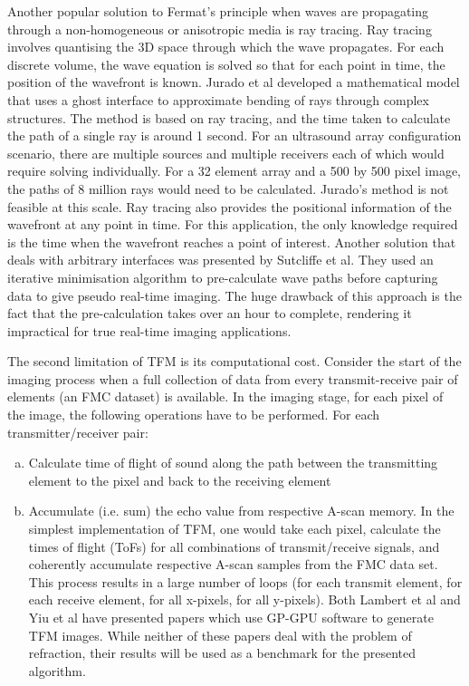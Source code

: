 Another popular solution to Fermat's principle when waves are propagating through a non-homogeneous or anisotropic media is ray tracing. Ray tracing involves quantising the 3D space through which the wave propagates. For each discrete volume, the wave equation is solved so that for each point in time, the position of the wavefront is known\cite{zhang_ray-based_2006}. Jurado et al developed a mathematical model that uses a ghost interface to approximate bending of rays through complex structures\cite{jurado_fast_1998}. The method is based on ray tracing, and the time taken to calculate the path of a single ray is around 1 second. For an ultrasound array configuration scenario, there are multiple sources and multiple receivers each of which would require solving individually. For a 32 element array and a 500 by 500 pixel image, the paths of 8 million rays would need to be calculated. Jurado's method is not feasible at this scale. Ray tracing also provides the positional information of the wavefront at any point in time. For this application, the only knowledge required is the time when the wavefront reaches a point of interest. Another solution that deals with arbitrary interfaces was presented by Sutcliffe et al\cite{sutcliffe_real-time_2012}. They used an iterative minimisation algorithm to pre-calculate wave paths before capturing data to give pseudo real-time imaging. The huge drawback of this approach is the fact that the pre-calculation takes over an hour to complete, rendering it impractical for true real-time imaging applications.

The second limitation of TFM is its computational cost. Consider the start of the imaging process when a full collection of data from every transmit-receive pair of elements (an FMC dataset) is available. In the imaging stage, for each pixel of the image, the following operations have to be performed.  For each transmitter/receiver pair:
\begin{enumerate}[a)]
\item Calculate time of flight of sound along the path between the transmitting element to the pixel and back to the receiving element
\item Accumulate (i.e. sum) the echo value from respective A-scan memory. In the simplest implementation of TFM, one would take each pixel, calculate the times of flight (ToFs) for all combinations of transmit/receive signals, and coherently accumulate respective A-scan samples from the FMC data set. This process results in a large number of loops (for each transmit element, for each receive element, for all x-pixels, for all y-pixels). Both Lambert et al\cite{lambert_performance_2012} and Yiu et al\cite{yiu_gpu-based_2011} have presented papers which use GP-GPU software to generate TFM images. While neither of these papers deal with the problem of refraction, their results will be used as a benchmark for the presented algorithm.
\end{enumerate}


